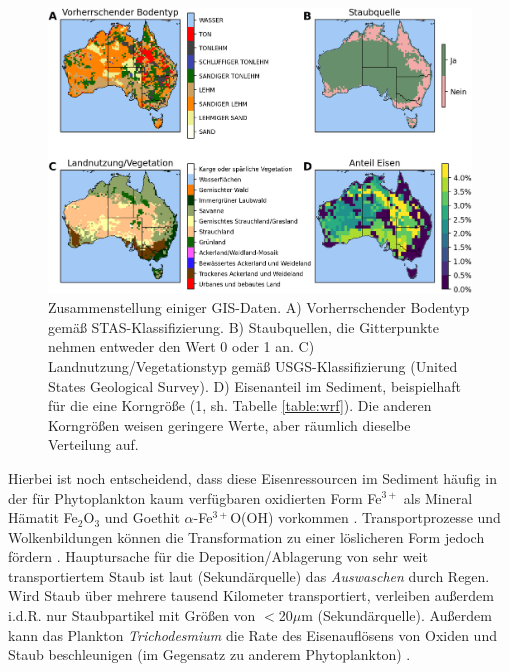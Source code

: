 \documentclass[12pt,a4paper,onecolumn]{scrartcl}
\begin{document}
\begin{figure}
\includegraphics[width=\textwidth]{bilder/soil_type_iron.png}
\caption{Zusammenstellung einiger GIS-Daten. A) Vorherrschender Bodentyp gemäß STAS-Klassifizierung. B) Staubquellen, die Gitterpunkte nehmen entweder den Wert 0 oder 1 an. C) Landnutzung/Vegetationstyp gemäß USGS-Klassifizierung (United States Geological Survey). D) Eisenanteil im Sediment, beispielhaft für die eine Korngröße (1, sh. Tabelle \ref{table:wrf}). Die anderen Korngrößen weisen geringere Werte, aber räumlich dieselbe Verteilung auf.} \label{fig:soil_type_iron}
\end{figure}
Hierbei ist noch entscheidend, dass diese Eisenressourcen im Sediment häufig in der für Phytoplankton kaum verfügbaren oxidierten Form Fe$^{3+}$ als Mineral Hämatit Fe$_2$O$_3$ und Goethit $\alpha$-Fe$^{3+}$O(OH) vorkommen \citep{Reynolds.2014}. Transportprozesse und Wolkenbildungen können die Transformation zu einer löslicheren Form jedoch fördern \citep{Shao.2011}. Hauptursache für die Deposition/Ablagerung von sehr weit transportiertem Staub ist laut \citet{Marx.2018} (Sekundärquelle) das \textit{Auswaschen} durch Regen. Wird Staub über mehrere tausend Kilometer transportiert, verleiben außerdem  i.d.R. nur Staubpartikel mit Größen von $<$20$\mu$m \citep{Marx.2018} (Sekundärquelle). Außerdem kann das Plankton \textit{Trichodesmium} die Rate des Eisenauflösens von Oxiden und Staub beschleunigen (im Gegensatz zu anderem Phytoplankton) \citep{Gabric.2016}.
\end{document}
